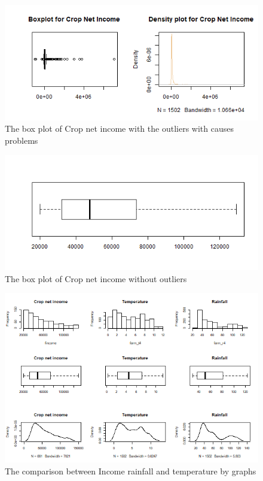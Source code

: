 \documentclass[12pt, a4paper]{article}
\begin{document}
\begin{figure}[h]
\centering
\includegraphics[scale=.5]{income.png}
\caption{The box plot of Crop net income with the outliers with causes problems}
\end{figure}
\begin{figure}[h]
\centering
\includegraphics[scale=.5]{income2.png}
\caption{The box plot of Crop net income without outliers}
\end{figure}
\begin{figure}[h]
\centering
\includegraphics[scale=.5]{variables.png}
\caption{The comparison between Income rainfall and temperature by graphs}
\end{figure}
\end{document}
